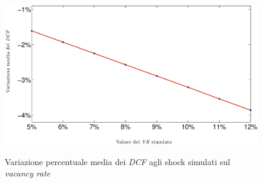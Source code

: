\begin{figure}[htbp]
\begin{center}
{\includegraphics[scale=0.40]{Grafici/Terzo/varvr.eps}}
\caption[Variazione media \% dei \textit{DCF} vs $\Delta$ del {\itshape vacancy rate}]{Variazione percentuale media dei \textit{DCF} agli shock simulati sul {\itshape vacancy rate}}
\label{graf:varvr}
\end{center}
\end{figure}